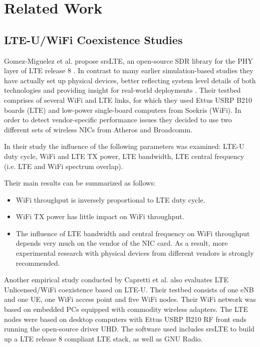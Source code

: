 \chapter{Related Work}
\label{ch:related-work}

\section{LTE-U/WiFi Coexistence Studies}

Gomez-Miguelez et al. propose srsLTE, an open-source SDR library for the PHY layer of LTE release 8 \cite{gomezmiguelez16}. In contrast to many earlier simulation-based studies they have actually set up physical devices, better reflecting system level details of both technologies and providing insight for real-world deployments \cite{rupasinghe14} \cite{nihtilä13} \cite{jeon14} \cite{cavalcante13} . Their testbed comprises of several WiFi and LTE links, for which they used Ettus USRP B210 boards (LTE) and low-power single-board computers from Soekris (WiFi). In order to detect vendor-specific performance issues they decided to use two different sets of wireless NICs from Atheros and Broadcomm.

In their study the influence of the following parameters was examined: LTE-U duty cycle, WiFi and LTE TX power, LTE bandwidth, LTE central frequency (i.e. LTE and WiFi spectrum overlap).

Their main results can be summarized as follows:

\begin{itemize}
	\item WiFi throughput is inversely proportional to LTE duty cycle.
	\item WiFi TX power has little impact on WiFi throughput.
	\item The influence of LTE bandwidth and central frequency on WiFi throughput depends very much on the vendor of the NIC card. As a result, more experimental research with physical devices from different vendors is strongly recommended. 
\end{itemize}

Another empirical study \cite{capretti16} conducted by Capretti et al. also evaluates LTE Unlicensed/WiFi coexistence based on LTE-U.  Their testbed consists of one eNB and one UE, one WiFi access point and five WiFi nodes. Their WiFi network was based on embedded PCs equipped with commodity wireless adapters. The LTE nodes were based on desktop computers with Ettus USRP B210 RF front ends running the open-source driver UHD. The software used includes srsLTE to build up a LTE release 8 compliant LTE stack, as well as GNU Radio. 

